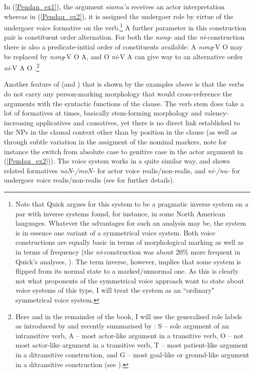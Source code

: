 In (\ref{Pendau_ex1}), the argument \textit{siama'u} receives an actor interpretation whereas in (\ref{Pendau_ex2}), it is assigned the undergoer role by virtue of the undergoer voice formative on the verb.\footnote{Note that Quick argues for this system to be a pragmatic inverse system on a par with inverse systems found, for instance, in some North American languages. Whatever the advantages for such an analysis may be, the  system is in essence one variant of a symmetrical voice system. Both voice constructions are equally basic in terms of morphological marking as well as in terms of frequency (the \textit{ni}-construction was about 20\% more frequent in Quick's analyses, \citealt[580]{Quick2007}). The term inverse, however, implies that some system is flipped from its normal state to a marked/unnormal one. As this is clearly not what proponents of the symmetrical voice approach want to state about voice systems of this type, I will treat the  system as an ``ordinary" symmetrical voice system.} A further parameter in this construction pair is constituent order alternation. For both the \textit{nong}- and the \textit{ni}-construction there is also a predicate-initial order of constituents available: A \textit{nong}-V O may be replaced by \textit{nong}-V O A, and O \textit{ni}-V A can give way to an alternative order \textit{ni}-V A O \citep[366]{Quick2007}.\footnote{Here and in the remainder of the book, I will use the generalised role labels as introduced by \textcite{Dixon1979} and recently summarised by \textcite{Bickel2011}: S -- sole argument of an intransitive verb, A -- most actor-like argument in a transitive verb, O -- not most actor-like argument in a transitive verb, T -- most patient-like argument in a ditransitive construction, and G -- most goal-like or ground-like argument in a ditransitive construction (see \citealt[402ff.]{Bickel2011}).}

Another feature of  (and ) that is shown by the examples above is that the verbs do not carry any person-marking morphology that would cross-reference the arguments with the syntactic functions of the clause. The verb stem does take a lot of formatives at times, basically stem-forming morphology and valency-increasing applicatives and causatives, yet there is no direct link established to the NPs in the clausal context other than by position in the clause (as well as through subtle variation in the assigment of the nominal markers, note for instance the switch from absolute case to genitive case in the actor argument in (\ref{Pendau_ex2})). The  voice system works in a quite similar way, and shows related formatives \textit{noN-/moN-} for actor voice realis/non-realis, and \textit{ni-/nu-} for undergoer voice realis/non-realis (see \citealt{mayani2013grammar} for further details). 

